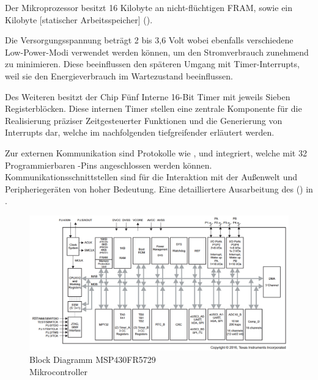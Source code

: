 Der Mikroprozessor besitzt 16 Kilobyte an nicht-fl\"uchtigen FRAM, sowie ein Kilobyte [statischer Arbeitsspeicher] (). 

Die Versorgungsspannung betr\"agt 2 bis 3,6 Volt wobei ebenfalls verschiedene Low-Power-Modi verwendet werden k\"onnen, um den Stromverbrauch zunehmend zu minimieren. Diese beeinflussen den sp\"ateren Umgang mit Timer-Interrupts, weil sie den Energieverbrauch im Wartezustand beeinflussen. 

Des Weiteren besitzt der Chip F\"unf Interne 16-Bit Timer mit jeweils Sieben\\ Registerbl\"ocken. Diese internen Timer stellen eine zentrale Komponente f\"ur die Realisierung pr\"aziser Zeitgesteuerter Funktionen und die Generierung von Interrupts dar, welche im nachfolgenden  tiefgreifender erl\"autert werden.

Zur externen Kommunikation sind Protokolle wie ,  und  integriert, welche mit 32 Programmierbaren -Pins angeschlossen werden k\"onnen. Kommunikationsschnittstellen sind f\"ur die Interaktion mit der Au{\ss}enwelt und Peripherieger\"aten von hoher Bedeutung. Eine detailliertere Ausarbeitung des  () in . 

\begin{figure}[h!]
	\centering
	\includegraphics[width=1.0\textwidth]{../Bilder/FunctionalBlockDiagram_MSP430FR5729.png}
	\caption{Block Diagramm MSP430FR5729\\Mikrocontroller {}}
	\label{fig:BlockDiagramm_msp430}
\end{figure}

